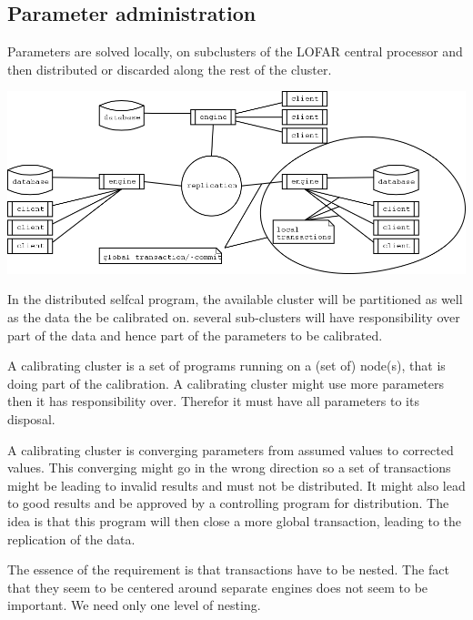 \documentclass[]{lofar}
\begin{document}
\subsection{Parameter administration}
\label{id2720046}\hypertarget{id2720046}{}%



    Parameters are solved locally, on subclusters of the LOFAR central
    processor and then distributed or discarded along the rest of the
    cluster.

   
{{\includegraphics[]{local-_global-commit.png}}}



    In the distributed selfcal program, the available cluster will be
    partitioned as well as the data the be calibrated on. several
    sub-clusters will have responsibility over part of the data and hence
    part of the parameters  to be calibrated.

   



    A calibrating cluster is a set of programs running on a (set of)
    node(s), that is doing part of the calibration.
    A calibrating cluster might use more parameters then it has
    responsibility over. Therefor it must have all parameters to its
    disposal.

   



    A calibrating cluster is converging parameters from assumed values
    to corrected values. This converging might go in the wrong direction
    so a set of transactions might be leading to invalid results and
    must not be distributed. It might also lead to good results and be
    approved by a controlling program for distribution. The idea is that
    this program will then close a more global transaction, leading to
    the replication of the data.

   



    The essence of the requirement is that transactions have to be
    nested. The fact that they seem to be centered around separate
    engines does not seem to be important. We need only one level of
    nesting.
\end{document}
